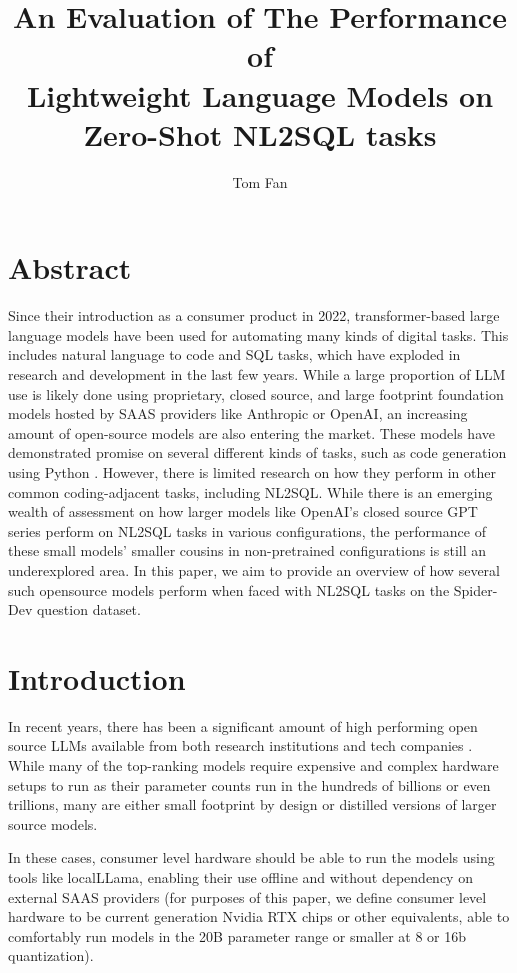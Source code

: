 \documentclass[sigconf]{acmart}
\title{An Evaluation of The Performance of \\
Lightweight Language Models on Zero-Shot NL2SQL tasks}
\author{Tom Fan}
\affiliation{
  \institution{Carleton University}
  \city{Ottawa}
  \country{Canada}
}
\begin{document}
\maketitle

\pagestyle{plain}


\section{Abstract}

Since their introduction as a consumer product in 2022, transformer-based large language models have been used for 
automating many kinds of digital tasks. This includes natural language to code and SQL tasks, which have exploded in 
research and development in the last few
years. While a large proportion of LLM use is likely done using proprietary, closed source, and large footprint 
foundation models hosted by SAAS providers like Anthropic or OpenAI, an increasing amount of open-source models are also 
entering the market. These models have demonstrated promise on several different kinds of tasks, such as code generation
using Python \cite{hasan2025smallcode}. However, there is limited research on how they perform in other common 
coding-adjacent tasks, including NL2SQL. While there is an emerging wealth of assessment on how larger models like OpenAI's
closed source GPT series perform on NL2SQL tasks in various configurations\cite{liu2024survey_nl2sql}\cite{nl2sqlsurvey},
the performance of these small models' smaller cousins in non-pretrained configurations is still an underexplored area.
In this paper, we aim to provide an overview of how several such opensource models perform when faced with  
NL2SQL tasks on the Spider-Dev question dataset.

\section{Introduction}

In recent years, there has been a significant amount of high performing open source LLMs available from both research 
institutions and tech companies \cite{llmstats2025}. While many of the top-ranking models require expensive and complex
hardware setups to run as their parameter counts run in the hundreds of billions or even trillions, many are either 
small footprint by design or distilled versions of larger source models. 

In these cases, consumer level hardware should be able to run the models using tools like localLLama, enabling their use
offline and without dependency on external SAAS providers (for purposes of this paper, we define consumer level hardware
to be current generation Nvidia RTX chips or other equivalents, able to comfortably run models in the 20B parameter range 
or smaller at 8 or 16b quantization). 
\end{document}
